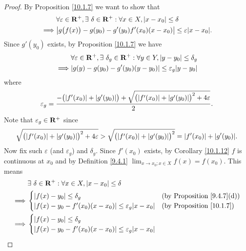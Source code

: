 \begin{proof}
    By Proposition \ref{10.1.7} we want to show that
    \begin{align*}
                 & \forall \varepsilon \in \R^+, \exists\ \delta \in \R^+ : \forall x \in X, \abs{x - x_0} \leq \delta \\
        \implies & \abs{g\big(f(x)\big) - g(y_0) - g'(y_0) f'(x_0) (x - x_0)} \leq \varepsilon \abs{x - x_0}.
    \end{align*}
    Since \(g'(y_0)\) exists, by Proposition \ref{10.1.7} we have
    \begin{align*}
                 & \forall \varepsilon \in \R^+, \exists\ \delta_g \in \R^+ : \forall y \in Y, \abs{y - y_0} \leq \delta_g \\
        \implies & \abs{g(y) - g(y_0) - g'(y_0) (y - y_0)} \leq \varepsilon_g \abs{y - y_0}
    \end{align*}
    where
    \[
        \varepsilon_g = \frac{-\big(\abs{f'(x_0)} + \abs{g'(y_0)}\big) + \sqrt{\big(\abs{f'(x_0)} + \abs{g'(y_0)}\big)^2 + 4 \varepsilon}}{2}.
    \]
    Note that \(\varepsilon_g \in \mathbf{R}^+\) since
    \[
        \sqrt{\big(\abs{f'(x_0)} + \abs{g'(y_0)}\big)^2 + 4 \varepsilon} > \sqrt{\big(\abs{f'(x_0)} + \abs{g'(y_0)}\big)^2} = \abs{f'(x_0)} + \abs{g'(y_0)}.
    \]
    Now fix such \(\varepsilon\) (and \(\varepsilon_g\)) and \(\delta_g\).
    Since \(f'(x_0)\) exists, by Corollary \ref{10.1.12} \(f\) is continuous at \(x_0\) and by Definition \ref{9.4.1} \(\lim_{x \to x_0 ; x \in X} f(x) = f(x_0)\).
    This means
    \begin{align*}
                 & \exists\ \delta \in \R^+ : \forall x \in X, \abs{x - x_0} \leq \delta                                                     \\
        \implies & \begin{cases}
                       \abs{f(x) - y_0} \leq \delta_g                                        & \text{(by Proposition \ref{9.4.7}(d))} \\
                       \abs{f(x) - y_0 - f'(x_0) (x - x_0)} \leq \varepsilon_g \abs{x - x_0} & \text{(by Proposition \ref{10.1.7})}
                   \end{cases} \\
        \implies & \begin{cases}
                       \abs{f(x) - y_0} \leq \delta_g                                        \\
                       \abs{f(x) - y_0 - f'(x_0) (x - x_0)} \leq \varepsilon_g \abs{x - x_0} \\

\end{cases}
\end{align*}
\end{proof}
